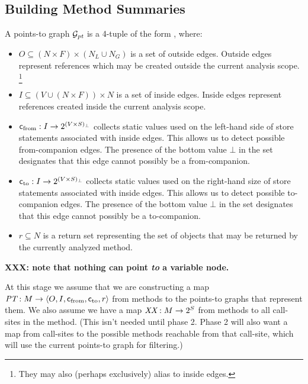 \documentclass[11pt,notitlepage]{article}
\newcommand{\bigvar}[1]{\ensuremath{\text{\it #1}}}
\newcommand{\func}[1]{\ensuremath{\text{\sffamily #1}}}
\newcommand{\ptgraphA}
           {\tuple{O,I,\func{c}_\text{from},\func{c}_\text{to},r}}
\begin{document}
\subsection{Building Method Summaries}
                             
A points-to graph $\mathcal{G}_\bigvar{pt}$ is a 4-tuple of the form \ptgraphA,
where:
\begin{itemize}
\item $O \subseteq (N\times F)\times(N_L \cup N_G)$ is a set of
outside edges.  Outside edges represent references which may be
created outside the current analysis scope.%
\footnote{They may also (perhaps exclusively) alias to inside edges.}
\item $I \subseteq (V\cup(N\times F))\times N$ is a set of inside
edges.  Inside edges represent references created inside the current
analysis scope.
\item $\func{c}_\text{from}:I\to 2^{(V\times S)_\bot}$ collects static values
used on the left-hand side of store statements associated with
inside edges.  This allows us to detect possible from-companion edges.
The presence of the bottom value $\bot$ in the set designates that
this edge cannot possibly be a from-companion.
\item $\func{c}_\text{to}:I\to 2^{(V\times S)_\bot}$ collects static values
used on the right-hand size of store statements associated with
inside edges.  This allows us to detect possible to-companion edges.
The presence of the bottom value $\bot$ in the set designates that
this edge cannot possibly be a to-companion.
\item $r \subseteq N$ is a return set representing the set of objects
that may be returned by the currently analyzed method.
\end{itemize}
\textbf{XXX: note that nothing can point \emph{to} a variable node.}

At this stage we assume that we are constructing a map
$\bigvar{PT}:M\to\ptgraphA$ from methods to the points-to graphs that
represent them.  We also assume we have a map $\bigvar{XX}:M\to 2^S$
from methods to all call-sites in the method.  (This isn't needed
until phase 2.  Phase 2 will also want a map from call-sites to
the possible methods reachable from that call-site, which will
use the current points-to graph for filtering.)
\end{document}
